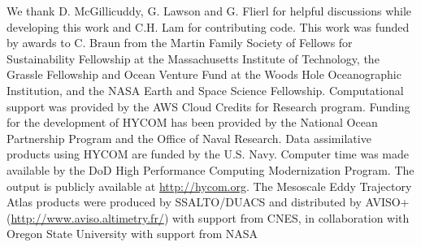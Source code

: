 {We thank D. McGillicuddy, G. Lawson and G. Flierl for helpful discussions while developing this work and C.H. Lam for contributing code. This work was funded by awards to C. Braun from the Martin Family Society of Fellows for Sustainability Fellowship at the Massachusetts Institute of Technology, the Grassle Fellowship and Ocean Venture Fund at the Woods Hole Oceanographic Institution, and the NASA Earth and Space Science Fellowship. Computational support was provided by the AWS Cloud Credits for Research program. Funding for the development of HYCOM has been provided by the National Ocean Partnership Program and the Office of Naval Research. Data assimilative products using HYCOM are funded by the U.S. Navy. Computer time was made available by the DoD High Performance Computing Modernization Program. The output is publicly available at \url{http://hycom.org}. The Mesoscale Eddy Trajectory Atlas products were produced by SSALTO/DUACS and distributed by AVISO+ (\url{http://www.aviso.altimetry.fr/}) with support from CNES, in collaboration with Oregon State University with support from NASA


}
 


